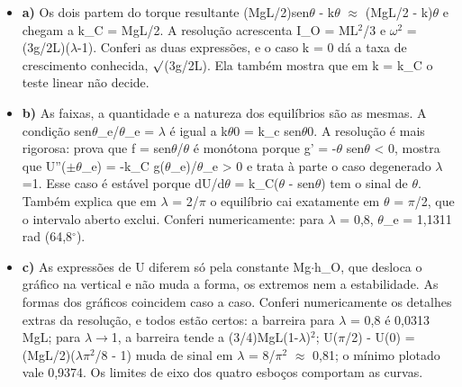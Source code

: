 \documentclass{article}%
\begin{document}
\begin{itemize}%
\item%
\textbf{a)} Os dois partem do torque resultante (MgL/2)sen$\theta$ - k$\theta$ $\approx$ (MgL/2 - k)$\theta$ e chegam a k\_C = MgL/2. A resolução acrescenta I\_O = ML$^2$/3 e $\omega$$^2$ = (3g/2L)($\lambda$-1). Conferi as duas expressões, e o caso k = 0 dá a taxa de crescimento conhecida, $\surd$(3g/2L). Ela também mostra que em k = k\_C o teste linear não decide.%
\item%
\textbf{b)} As faixas, a quantidade e a natureza dos equilíbrios são as mesmas. A condição sen$\theta$\_e/$\theta$\_e = $\lambda$ é igual a k$\theta$0 = k\_c sen$\theta$0. A resolução é mais rigorosa: prova que f = sen$\theta$/$\theta$ é monótona porque g' = -$\theta$ sen$\theta$ < 0, mostra que U''($\pm$$\theta$\_e) = -k\_C g($\theta$\_e)/$\theta$\_e > 0 e trata à parte o caso degenerado $\lambda$=1. Esse caso é estável porque dU/d$\theta$ = k\_C($\theta$ - sen$\theta$) tem o sinal de $\theta$. Também explica que em $\lambda$ = 2/$\pi$ o equilíbrio cai exatamente em $\theta$ = $\pi$/2, que o intervalo aberto exclui. Conferi numericamente: para $\lambda$ = 0,8, $\theta$\_e = 1,1311 rad (64,8$^\circ$).%
\item%
\textbf{c)} As expressões de U diferem só pela constante Mg$\cdot$h\_O, que desloca o gráfico na vertical e não muda a forma, os extremos nem a estabilidade. As formas dos gráficos coincidem caso a caso. Conferi numericamente os detalhes extras da resolução, e todos estão certos: a barreira para $\lambda$ = 0,8 é 0,0313 MgL; para $\lambda$$\to$1, a barreira tende a (3/4)MgL(1-$\lambda$)$^2$; U($\pi$/2) - U(0) = (MgL/2)($\lambda$$\pi$$^2$/8 - 1) muda de sinal em $\lambda$ = 8/$\pi$$^2$ $\approx$ 0,81; o mínimo plotado vale 0,9374. Os limites de eixo dos quatro esboços comportam as curvas.%
\end{itemize}%
\end{document}
